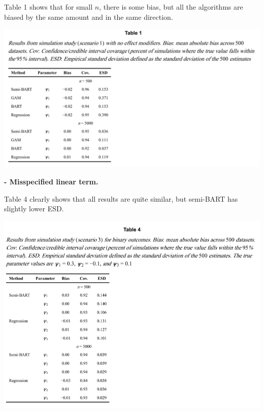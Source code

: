 \documentclass[a0paper,portrait]{baposter}
\renewcommand{\baselinestretch}{1}
\begin{document}
\begin{poster}
{Table 1 shows that for small $n$, there is some bias, but all the algorithms are biased by the same amount and in the same direction.

\begin{center}
\vspace{-0.2cm}
\includegraphics[width=1\linewidth]{./images/table1.png}
\end{center}

\textbf{- Misspecified linear term.}

Table 4 clearly shows that all results are quite similar, but semi-BART has slightly lower ESD.
\begin{flushleft}
\vspace{-0.2cm}
\includegraphics[width=0.95\linewidth]{./images/table4.png}
\end{flushleft}

}



\setlength{\itemsep}{-20pt}%
\renewcommand{\baselinestretch}{1.05}


\end{poster}
\end{document}
